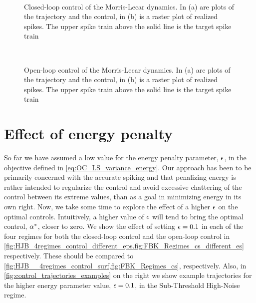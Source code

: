 \begin{figure}[h]
\begin{center}
\\
\caption[Closed-loop control of Morris-Lecar model]{Closed-loop control of the
Morris-Lecar dynamics. In (a) are plots of the trajectory and the control, in (b)
  is a raster plot of realized spikes. The upper spike train above the
solid line is the target spike train}
\label{fig:ML_controled_simulation_cl}
\end{center}
\end{figure} 
\begin{figure}[h] 
\begin{center}
\\
\caption[Open-loop control of Morris-Lecar model]{Open-loop control of the
Morris-Lecar dynamics. In (a) are plots of the trajectory and the control, in (b)
  is a raster plot of realized spikes. The upper spike train above the
solid line is the target spike train}
\label{fig:ML_controled_simulation_ol}
\end{center}
\end{figure} 

\section{Effect of energy penalty}
\label{sec:effect_of_eps}
So far we have assumed a low value for the energy penalty parameter, ${\epsilon}$, in
the objective defined in \cref{eq:OC_LS_variance_energy}. Our approach has been
to be primarily concerned with the accurate spiking and that penalizing energy
is rather intended to regularize the control and avoid excessive chattering of
the control between its extreme values, than as a goal in minimizing energy in
its own right. Now, we take some time to explore the effect of a higher ${\epsilon}$
on the optimal controls. Intuitively, a higher value of ${\epsilon}$ will tend to
bring the optimal control, $\alpha^*$, closer to zero. We show the effect of setting
${\epsilon} = 0.1$ in each of the four regimes for both the closed-loop control and
the open-loop control in
\cref{fig:HJB_4regimes_control_different_eps,fig:FBK_Regimes_cs_different_es}
respectively. These should be compared to
\cref{fig:HJB__4regimes_control_surf,fig:FBK_Regimes_cs}, respectively.
Also, in \cref{fig:control_trajectories_examples} on the right we
show example trajectories for the higher energy parameter value, ${\epsilon}=0.1$, in
the Sub-Threshold High-Noise regime.

